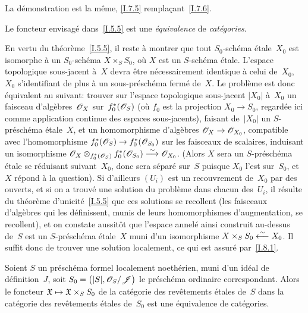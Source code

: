 La d\'emonstration est la m\^eme, \ref{I.7.5} rempla\c cant~\ref{I.7.6}.

\begin{theoreme}
\label{I.8.3}
Le foncteur envisag\'e dans~\ref{I.5.5} est une
\emph{équivalence} de \emph{catégories}.
\end{theoreme}

En vertu du th\'eor\`eme~\ref{I.5.5}, il reste \`a montrer que
tout $S_0$-sch\'ema \'etale~$X_0$ est isomorphe \`a un
$S_0$-sch\'ema $X \times_S S_0$, o\`u $X$ est un $S$-sch\'ema
\'etale. L'espace topologique sous-jacent \`a~$X$ devra \^etre
n\'ecessairement identique \`a celui de~$X_0$, $X_0$ s'identifiant
de plus \`a un sous-pr\'esch\'ema ferm\'e de~$X$. Le
probl\`eme est donc \'equivalent au suivant: trouver sur l'espace
topologique sous-jacent $|X_0|$ \`a~$X_0$ un faisceau
d'alg\`ebres~$\cal{O}_X$ sur~$f_0^*(\cal{O}_S)$ (o\`u $f_0$ est
la projection $X_0 \to S_0$, regard\'ee ici comme application
continue des espaces sous-jacents), faisant de~$|X_0|$ un
$S$-pr\'esch\'ema \'etale~$X$, et un homomorphisme
d'alg\`ebres $\cal{O}_X \to \cal{O}_{X_0}$, compatible avec
l'homomorphisme $f_0^*(\cal{O}_S) \to f_0^*(\cal{O}_{S_0})$ sur
les faisceaux de scalaires, induisant un isomorphisme $\cal{O}_X
\otimes_{f_0^*(\cal{O}_S)} f_0^*(\cal{O}_{S_0}) \isomto
\cal{O}_{X_0}$. (Alors $X$ sera un $S$-pr\'esch\'ema \'etale se
r\'eduisant suivant~$X_0$,
donc sera s\'epar\'e sur~$S$ puisque $X_0$ l'est sur~$S_0$, et $X$
r\'epond \`a la question). Si d'ailleurs $(U_i)$ est un
recouvrement de~$X_0$ par des ouverts, et si on a trouv\'e une
solution du probl\`eme dans chacun des~$U_i$, il r\'esulte du
th\'eor\`eme d'unicit\'e~\ref{I.5.5} que ces solutions se
recollent (\ie les faisceaux d'alg\`ebres qui les d\'efinissent,
munis de leurs homomorphismes d'augmentation, se recollent), et on
constate aussit\^ot que l'espace annel\'e ainsi construit
au-dessus de~$S$ est un $S$-pr\'esch\'ema \'etale~$X$ muni d'un
isomorphisme $X \times_S S_0 \overset{\sim}{\longleftarrow} X_0$. Il suffit donc de trouver
une solution localement, ce qui est assur\'e par~\ref{I.8.1}.

\begin{corollaire}
\label{I.8.4}
Soient $S$ un pr\'esch\'ema formel localement noeth\'erien, muni
d'un id\'eal de d\'efinition~$J$, soit $S_0 =
\big(|S|,\cal{O}_S/\cal{J}\big)$ le pr\'esch\'ema ordinaire
correspondant. Alors le foncteur $\goth{X} \mto \goth{X} \times_S
S_0$ de la cat\'egorie des rev\^etements \'etales de~$S$ dans la
cat\'egorie des rev\^etements \'etales de~$S_0$ est une
\'equivalence de cat\'egories.
\end{corollaire}

